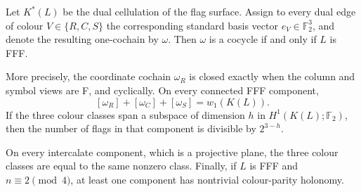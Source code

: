 \begin{theorem}
\label{thm:colour-parity-holonomy}
Let $K^*(L)$ be the dual cellulation of the flag surface.  Assign to every
dual edge of colour $V\in\{R,C,S\}$ the corresponding standard basis vector
$e_V\in\mathbb F_2^3$, and denote the resulting one-cochain by $\omega$.
Then $\omega$ is a cocycle if and only if $L$ is FFF.

More precisely, the coordinate cochain $\omega_R$ is closed exactly when the
column and symbol views are F, and cyclically.  On every connected FFF
component,
\[
 [\omega_R]+[\omega_C]+[\omega_S]=w_1(K(L)).
\]
If the three colour classes span a subspace of dimension $h$ in
$H^1(K(L);\mathbb F_2)$, then the number of flags in that component is
divisible by $2^{3-h}$.

On every intercalate component, which is a projective plane, the three colour
classes are equal to the same nonzero class.  Finally, if $L$ is FFF and
$n\equiv2\pmod4$, at least one component has nontrivial colour-parity
holonomy.
\end{theorem}

